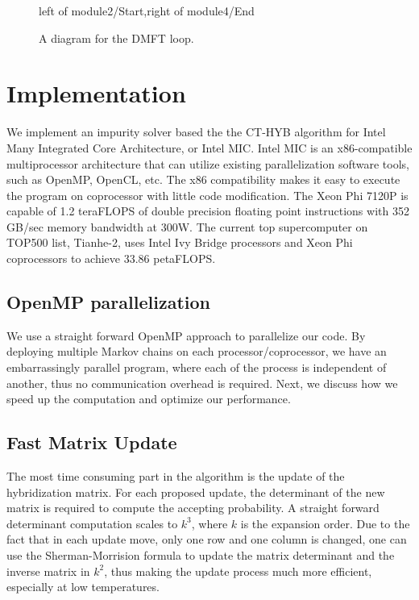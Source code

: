 \begin{figure}
  \centering
{}
{left of module2/Start,right of module4/End}
  \caption{A diagram for the DMFT loop.}
\end{figure}

\section{Implementation}
\label{ssec:hyb-implementation}
We implement an impurity solver based the the CT-HYB algorithm for 
Intel Many Integrated Core Architecture, or Intel MIC. Intel MIC is an 
x86-compatible multiprocessor architecture that can utilize existing 
parallelization software tools, such as OpenMP, OpenCL, etc. The x86 
compatibility makes it easy to execute the program on coprocessor with little
code modification. The Xeon Phi 7120P is capable of 1.2 teraFLOPS of double 
precision floating point instructions with 352 GB/sec memory bandwidth at 300W.
The current top supercomputer on TOP500 list, Tianhe-2, uses Intel Ivy Bridge
processors and Xeon Phi coprocessors to achieve 33.86 petaFLOPS.

\subsection{OpenMP parallelization}
We use a straight forward OpenMP approach to parallelize our code. By deploying
multiple Markov chains on each processor/coprocessor, we have an embarrassingly 
parallel program, where each of the process is independent of another, thus no
communication overhead is required. Next, we discuss how we speed up the 
computation and optimize our performance. 

\subsection{Fast Matrix Update}
\label{sec:cthyb_fmu}
The most time consuming part in the algorithm is the update of the hybridization
matrix. For each proposed update, the determinant of the new matrix is required
to compute the accepting probability. A straight forward determinant computation
scales to $k^3$, where $k$ is the expansion order. Due to the fact that in each
update move, only one row and one column is changed, one can use the 
Sherman-Morrision formula to update the matrix determinant and the inverse 
matrix in $k^2$, thus making the update process much more efficient, especially 
at low temperatures.

